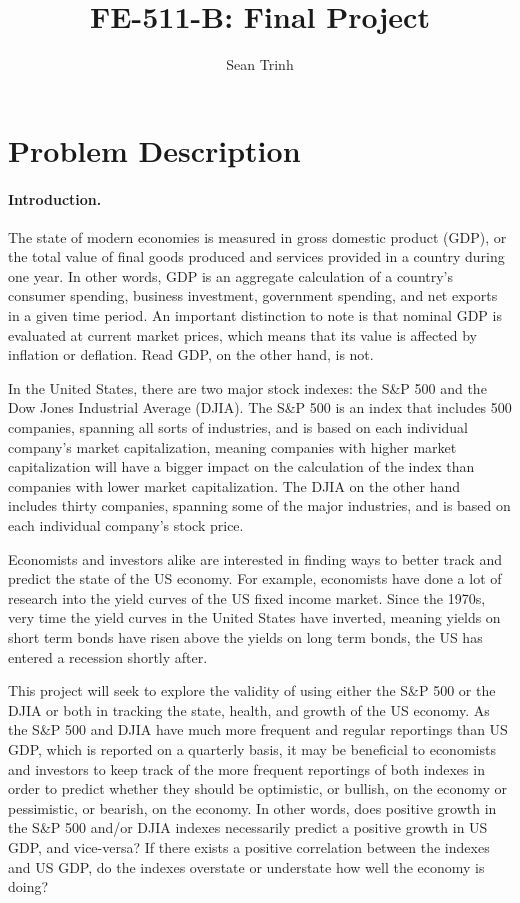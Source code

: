 \documentclass[11pt]{article}
\numberwithin{equation}{section}
\begin{document}
\title{FE-511-B: Final Project}

\author{Sean Trinh}


\maketitle


\section{Problem Description}

\paragraph{Introduction.}

The state of modern economies is measured in gross domestic product (GDP), or the total value of final goods produced and services provided in a country during one year. In other words, GDP is an aggregate calculation of a country's consumer spending, business investment, government spending, and net exports in a given time period. An important distinction to note is that nominal GDP is evaluated at current market prices, which means that its value is affected by inflation or deflation. Read GDP, on the other hand, is not.

In the United States, there are two major stock indexes: the S\&P 500 and the Dow Jones Industrial Average (DJIA). The S\&P 500 is an index that includes 500 companies, spanning all sorts of industries, and is based on each individual company's market capitalization, meaning companies with higher market capitalization will have a bigger impact on the calculation of the index than companies with lower market capitalization. The DJIA on the other hand includes thirty companies, spanning some of the major industries, and is based on each individual company's stock price.

Economists and investors alike are interested in finding ways to better track and predict the state of the US economy. For example, economists have done a lot of research into the yield curves of the US fixed income market. Since the 1970s, very time the yield curves in the United States have inverted, meaning yields on short term bonds have risen above the yields on long term bonds, the US has entered a recession shortly after.

This project will seek to explore the validity of using either the S\&P 500 or the DJIA or both in tracking the state, health, and growth of the US economy. As the S\&P 500 and DJIA have much more frequent and regular reportings than US GDP, which is reported on a quarterly basis, it may be beneficial to economists and investors to keep track of the more frequent reportings of both indexes in order to predict whether they should be optimistic, or bullish, on the economy or pessimistic, or bearish, on the economy. In other words, does positive growth in the S\&P 500 and/or DJIA indexes necessarily predict a positive growth in US GDP, and vice-versa? If there exists a positive correlation between the indexes and US GDP, do the indexes overstate or understate how well the economy is doing?
\end{document}
